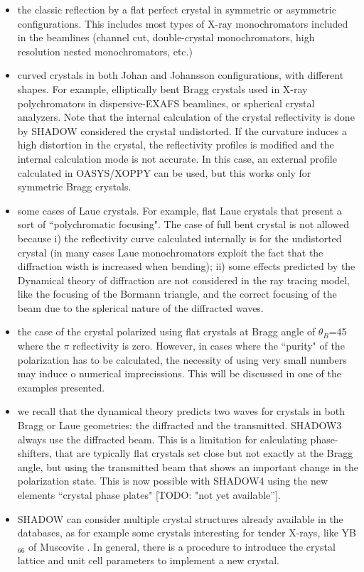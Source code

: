 \documentclass{iucr}
\newcommand{\todo}[1]{{\color{red}[TODO: "#1'']}}
\begin{document}
\begin{itemize}
    \item the classic reflection by a flat perfect crystal in symmetric or asymmetric configurations. This includes most types of X-ray monochromators included in the beamlines (channel cut, double-crystal monochromators, high resolution nested monochromators, etc.)
    \item curved crystals in both Johan and Johansson configurations, with different shapes. For example, elliptically bent Bragg crystals used in X-ray polychromators in dispersive-EXAFS beamlines, or spherical crystal analyzers. Note that the internal calculation of the crystal reflectivity is done by SHADOW considered the crystal undistorted. If the curvature induces a high distortion in the crystal, the reflectivity profiles is modified and the internal calculation mode is not accurate. In this case, an external profile calculated in OASYS/XOPPY can be used, but this works only for symmetric Bragg crystals.
    \item some cases of Laue crystals. For example, flat Laue crystals that present a sort of ``polychromatic focusing". The case of full bent crystal is not allowed because i) the reflectivity curve calculated internally is for the undistorted crystal (in many cases Laue monochromators exploit the fact that the diffraction wisth is increased when bending); ii) some effects predicted by the Dynamical theory of diffraction are not considered in the ray tracing model, like the focusing of the Bormann triangle, and the correct focusing of the beam due to the splerical nature of the diffracted waves. 
    \item the case of the crystal polarized using flat crystals at Bragg angle of $\theta_B$=\SI{45}{\deg} where the $\pi$ reflectivity is zero. However, in cases where the ``purity" of the polarization has to be calculated, the necessity of using very small numbers may induce o numerical imprecissions. This will be discussed in one of the examples presented. 
    \item we recall that the dynamical theory predicts two waves for crystals in both Bragg or Laue geometries: the diffracted and the transmitted. SHADOW3 always use the diffracted beam. This is a limitation for calculating phase-shifters, that are typically flat crystals set close but not exactly at the Bragg angle, but using the transmitted beam that shows an important change in the polarization state. This is now possible with SHADOW4 using the new elements ``crystal phase plates" \todo{not yet available}.
    \item SHADOW can consider multiple crystal structures already available in the databases, as for example some crystals interesting for tender X-rays, like YB$_{66}$ of Muscovite \cite{Yu_2022}. In general, there is a procedure to introduce the crystal lattice and unit cell parameters to implement a new crystal. 
\end{itemize}
\end{document}
